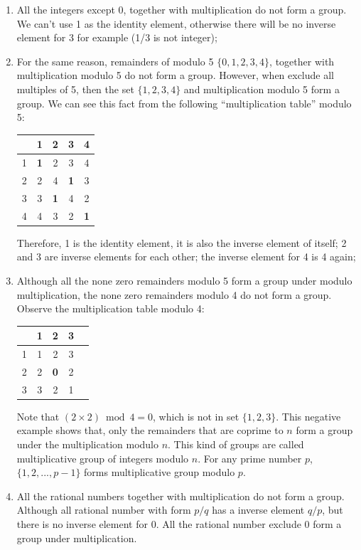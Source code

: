 \documentclass{article}
\begin{document}
\begin{enumerate}
\item All the integers except 0, together with multiplication do not form a group. We can't use 1 as the identity element, otherwise there will be no inverse element for 3 for example (1/3 is not integer);

\item For the same reason, remainders of modulo 5 $\{0, 1, 2, 3, 4\}$, together with multiplication modulo 5 do not form a group. However, when exclude all multiples of 5, then the set $\{1, 2, 3, 4\}$ and multiplication modulo 5 form a group. We can see this fact from the following ``multiplication table'' modulo 5:

\vspace{5mm}
  \begin{tabular}{c|cccc}
    & 1 & 2 & 3 & 4 \\
  \hline
  1 & \textbf{1} & 2 & 3 & 4 \\
  2 & 2 & 4 & \textbf{1} & 3 \\
  3 & 3 & \textbf{1} & 4 & 2 \\
  4 & 4 & 3 & 2 & \textbf{1}
  \end{tabular}
\vspace{5mm}

Therefore, 1 is the identity element, it is also the inverse element of itself; 2 and 3 are inverse elements for each other; the inverse element for 4 is 4 again;

\item Although all the none zero remainders modulo 5 form a group under modulo multiplication, the none zero remainders modulo 4 do not form a group. Observe the multiplication table modulo 4:

\vspace{5mm}
  \begin{tabular}{c|cccc}
    & 1 & 2 & 3 \\
  \hline
  1 & 1 & 2 & 3 \\
  2 & 2 & \textbf{0} & 2 \\
  3 & 3 & 2 & 1 \\
  \end{tabular}
\vspace{5mm}

Note that $(2 \times 2) \bmod 4 = 0$, which is not in set $\{1, 2, 3\}$. This negative example shows that, only the remainders that are coprime to $n$ form a group under the multiplication modulo $n$. This kind of groups are called multiplicative group of integers modulo $n$. For any prime number $p$, $\{1, 2, ..., p-1\}$ forms multiplicative group modulo $p$.

\item All the rational numbers together with multiplication do not form a group. Although all rational number with form $p/q$ has a inverse element $q/p$, but there is no inverse element for 0. All the rational number exclude 0 form a group under multiplication.
\end{enumerate}
\end{document}
